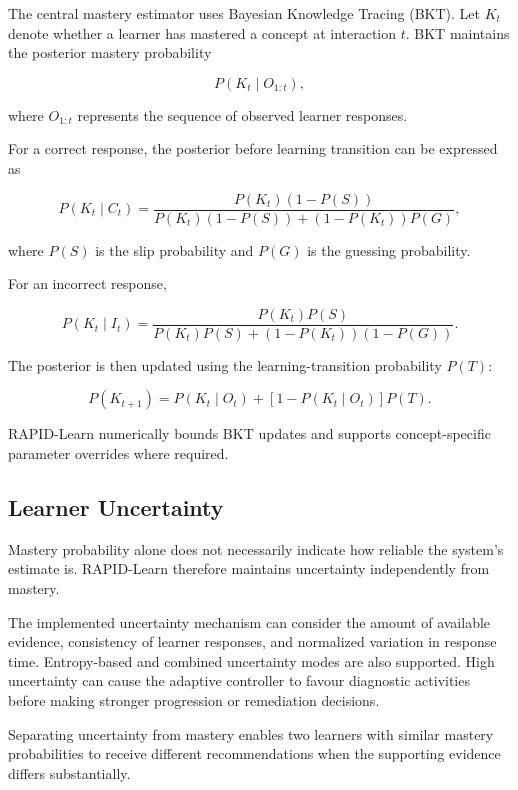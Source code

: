 \documentclass[conference]{IEEEtran}
\begin{document}
The central mastery estimator uses Bayesian Knowledge Tracing (BKT). Let $K_t$ denote whether a learner has mastered a concept at interaction $t$. BKT maintains the posterior mastery probability

\[
P(K_t \mid O_{1:t}),
\]

where $O_{1:t}$ represents the sequence of observed learner responses.

For a correct response, the posterior before learning transition can be expressed as

\begin{equation}
P(K_t \mid C_t)=
\frac{P(K_t)(1-P(S))}
{P(K_t)(1-P(S))+(1-P(K_t))P(G)},
\end{equation}

where $P(S)$ is the slip probability and $P(G)$ is the guessing probability.

For an incorrect response,

\begin{equation}
P(K_t \mid I_t)=
\frac{P(K_t)P(S)}
{P(K_t)P(S)+(1-P(K_t))(1-P(G))}.
\end{equation}

The posterior is then updated using the learning-transition probability $P(T)$:

\begin{equation}
P(K_{t+1})=
P(K_t \mid O_t)
+
\left[1-P(K_t \mid O_t)\right]P(T).
\end{equation}

RAPID-Learn numerically bounds BKT updates and supports concept-specific parameter overrides where required.

\subsection{Learner Uncertainty}

Mastery probability alone does not necessarily indicate how reliable the system's estimate is. RAPID-Learn therefore maintains uncertainty independently from mastery.

The implemented uncertainty mechanism can consider the amount of available evidence, consistency of learner responses, and normalized variation in response time. Entropy-based and combined uncertainty modes are also supported. High uncertainty can cause the adaptive controller to favour diagnostic activities before making stronger progression or remediation decisions.

Separating uncertainty from mastery enables two learners with similar mastery probabilities to receive different recommendations when the supporting evidence differs substantially.
\end{document}
